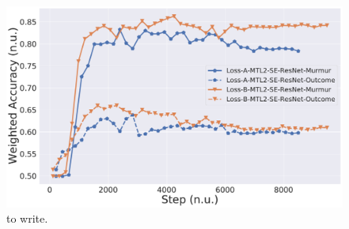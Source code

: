 

\begin{figure}[!htp]
\centering
\includegraphics[width=\linewidth]{images/clf-se-resnet-lossA-vs-lossB.pdf}
\caption[]
{to write.}
\label{fig:clf-se-resnet-lossA-vs-lossB}
\end{figure}
